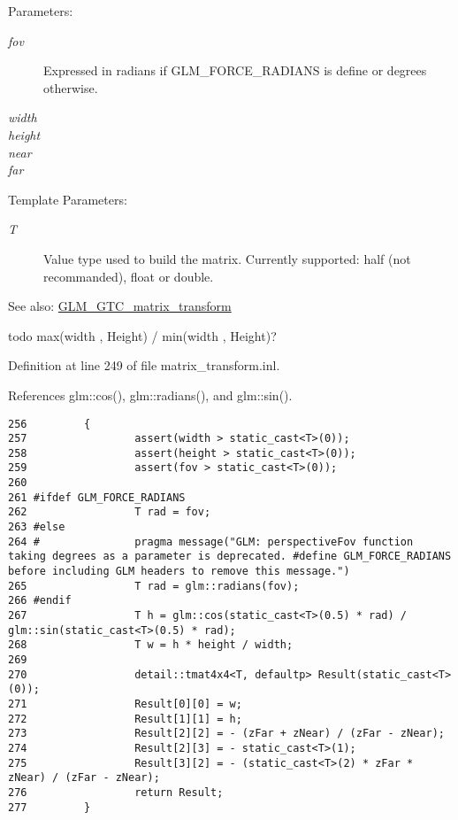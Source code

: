 \begin{Desc}
\item[Parameters:]
\begin{description}
\item[{\em fov}]Expressed in radians if GLM\_\-FORCE\_\-RADIANS is define or degrees otherwise. \item[{\em width}]\item[{\em height}]\item[{\em near}]\item[{\em far}]\end{description}
\end{Desc}
\begin{Desc}
\item[Template Parameters:]
\begin{description}
\item[{\em T}]Value type used to build the matrix. Currently supported: half (not recommanded), float or double. \end{description}
\end{Desc}
\begin{Desc}
\item[See also:]\hyperlink{group__gtc__matrix__transform}{GLM\_\-GTC\_\-matrix\_\-transform} \end{Desc}


todo max(width , Height) / min(width , Height)? 

Definition at line 249 of file matrix\_\-transform.inl.

References glm::cos(), glm::radians(), and glm::sin().

\begin{Code}\begin{verbatim}256         {
257                 assert(width > static_cast<T>(0));
258                 assert(height > static_cast<T>(0));
259                 assert(fov > static_cast<T>(0));
260         
261 #ifdef GLM_FORCE_RADIANS
262                 T rad = fov;
263 #else
264 #               pragma message("GLM: perspectiveFov function taking degrees as a parameter is deprecated. #define GLM_FORCE_RADIANS before including GLM headers to remove this message.")
265                 T rad = glm::radians(fov);
266 #endif
267                 T h = glm::cos(static_cast<T>(0.5) * rad) / glm::sin(static_cast<T>(0.5) * rad);
268                 T w = h * height / width; 
269 
270                 detail::tmat4x4<T, defaultp> Result(static_cast<T>(0));
271                 Result[0][0] = w;
272                 Result[1][1] = h;
273                 Result[2][2] = - (zFar + zNear) / (zFar - zNear);
274                 Result[2][3] = - static_cast<T>(1);
275                 Result[3][2] = - (static_cast<T>(2) * zFar * zNear) / (zFar - zNear);
276                 return Result;
277         }
\end{verbatim}
\end{Code}




